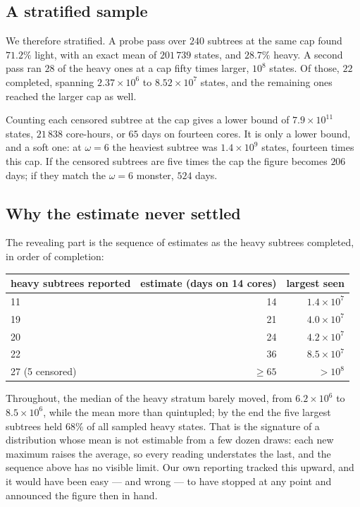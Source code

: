 \documentclass[11pt]{amsart}
\theoremstyle{remark}
\begin{document}
\subsection{A stratified sample}
We therefore stratified. A probe pass over $240$ subtrees at the same cap found
$71.2\%$ light, with an exact mean of $201\,739$ states, and $28.7\%$ heavy. A
second pass ran $28$ of the heavy ones at a cap fifty times larger,
$10^{8}$ states. Of those, $22$ completed, spanning $2.37 \times 10^{6}$ to
$8.52 \times 10^{7}$ states, and the remaining ones reached the larger cap as
well.

Counting each censored subtree at the cap gives a lower bound of
$7.9 \times 10^{11}$ states, $21\,838$ core-hours, or $65$ days on fourteen
cores. It is only a lower bound, and a soft one: at $\omega = 6$ the heaviest
subtree was $1.4 \times 10^{9}$ states, fourteen times this cap. If the censored
subtrees are five times the cap the figure becomes $206$ days; if they match the
$\omega = 6$ monster, $524$ days.

\subsection{Why the estimate never settled}
The revealing part is the sequence of estimates as the heavy subtrees completed,
in order of completion:

\begin{table}[h]
\centering
\begin{tabular}{lrr}
\toprule
heavy subtrees reported & estimate (days on 14 cores) & largest seen \\
\midrule
11 & 14 & $1.4 \times 10^{7}$ \\
19 & 21 & $4.0 \times 10^{7}$ \\
20 & 24 & $4.2 \times 10^{7}$ \\
22 & 36 & $8.5 \times 10^{7}$ \\
27 (5 censored) & $\ge 65$ & $> 10^{8}$ \\
\bottomrule
\end{tabular}
\end{table}

Throughout, the median of the heavy stratum barely moved, from
$6.2 \times 10^{6}$ to $8.5 \times 10^{6}$, while the mean more than quintupled;
by the end the five largest subtrees held $68\%$ of all sampled heavy states.
That is the signature of a distribution whose mean is not estimable from a few
dozen draws: each new maximum raises the average, so every reading understates
the last, and the sequence above has no visible limit. Our own reporting tracked
this upward, and it would have been easy --- and wrong --- to have stopped at any
point and announced the figure then in hand.
\end{document}
